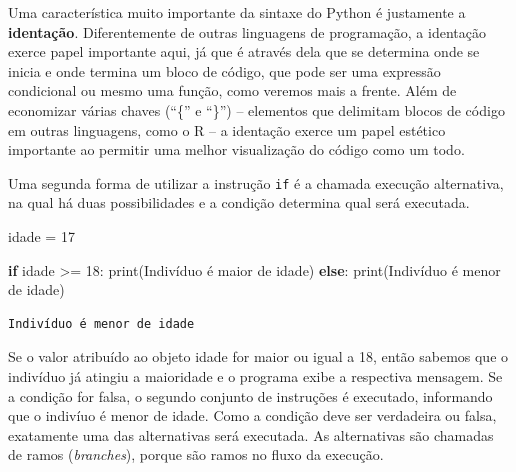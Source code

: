 \documentclass[
  brazilian,
  letterpaper,
  DIV=11,
  numbers=noendperiod]{scrreprt}
\newenvironment{Shaded}{\begin{snugshade}}{\end{snugshade}}
\newcommand{\BuiltInTok}[1]{\textcolor[rgb]{0.00,0.23,0.31}{#1}}
\newcommand{\ControlFlowTok}[1]{\textcolor[rgb]{0.00,0.23,0.31}{\textbf{#1}}}
\newcommand{\DecValTok}[1]{\textcolor[rgb]{0.68,0.00,0.00}{#1}}
\newcommand{\NormalTok}[1]{\textcolor[rgb]{0.00,0.23,0.31}{#1}}
\newcommand{\OperatorTok}[1]{\textcolor[rgb]{0.37,0.37,0.37}{#1}}
\newcommand{\StringTok}[1]{\textcolor[rgb]{0.13,0.47,0.30}{#1}}
\begin{document}
\begin{tcolorbox}[enhanced jigsaw, breakable, coltitle=black, title=\textcolor{quarto-callout-important-color}{\faExclamation}\hspace{0.5em}{Importante}, titlerule=0mm, colbacktitle=quarto-callout-important-color!10!white, opacitybacktitle=0.6, arc=.35mm, bottomrule=.15mm, toptitle=1mm, opacityback=0, colback=white, bottomtitle=1mm, toprule=.15mm, rightrule=.15mm, left=2mm, colframe=quarto-callout-important-color-frame, leftrule=.75mm]

Uma característica muito importante da sintaxe do Python é justamente a
\textbf{identação}. Diferentemente de outras linguagens de programação,
a identação exerce papel importante aqui, já que é através dela que se
determina onde se inicia e onde termina um bloco de código, que pode ser
uma expressão condicional ou mesmo uma função, como veremos mais a
frente. Além de economizar várias chaves (``\{'' e ``\}'') -- elementos
que delimitam blocos de código em outras linguagens, como o R -- a
identação exerce um papel estético importante ao permitir uma melhor
visualização do código como um todo.

\end{tcolorbox}

Uma segunda forma de utilizar a instrução \texttt{if} é a chamada
execução alternativa, na qual há duas possibilidades e a condição
determina qual será executada.

\begin{Shaded}
\begin{Highlighting}[]
\NormalTok{idade }\OperatorTok{=} \DecValTok{17}

\ControlFlowTok{if}\NormalTok{ idade }\OperatorTok{\textgreater{}=} \DecValTok{18}\NormalTok{:}
    \BuiltInTok{print}\NormalTok{(}\StringTok{\textquotesingle{}Indivíduo é maior de idade\textquotesingle{}}\NormalTok{)}
\ControlFlowTok{else}\NormalTok{:}
    \BuiltInTok{print}\NormalTok{(}\StringTok{\textquotesingle{}Indivíduo é menor de idade\textquotesingle{}}\NormalTok{)}
\end{Highlighting}
\end{Shaded}

\begin{verbatim}
Indivíduo é menor de idade
\end{verbatim}

Se o valor atribuído ao objeto idade for maior ou igual a 18, então
sabemos que o indivíduo já atingiu a maioridade e o programa exibe a
respectiva mensagem. Se a condição for falsa, o segundo conjunto de
instruções é executado, informando que o indivíuo é menor de idade. Como
a condição deve ser verdadeira ou falsa, exatamente uma das alternativas
será executada. As alternativas são chamadas de ramos (\emph{branches}),
porque são ramos no fluxo da execução.
\end{document}
